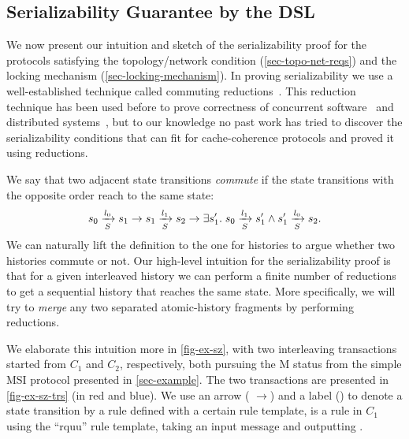 \documentclass[sigplan,10pt,review,anonymous,screen]{acmart}\settopmatter{printfolios=true,printccs=false,printacmref=false}
\begin{document}
\subsection{Serializability Guarantee by the \hemiola{} DSL}
\label{sec-sz-guarantee}

We now present our intuition and sketch of the serializability proof for the protocols satisfying the topology/network condition (\autoref{sec-topo-net-reqs}) and the locking mechanism (\autoref{sec-locking-mechanism}).
In proving serializability we use a well-established technique called commuting reductions~\cite{reduction}.
This reduction technique has been used before to prove correctness of concurrent software~\cite{Chajed:2018} and distributed systems~\cite{Hawblitzel:2015,Hawblitzel:2017}, but to our knowledge no past work has tried to discover the serializability conditions that can fit for cache-coherence protocols and proved it using reductions.

We say that two adjacent state transitions \emph{commute} if the state transitions with the opposite order reach to the same state:
\begin{displaymath}
  \semstep{S}{s_0}{l_0}{s_1} \to \semstep{S}{s_1}{l_1}{s_2} \to \exists s_1'.\; \semstep{S}{s_0}{l_1}{s_1'} \wedge \semstep{S}{s_1'}{l_0}{s_2}.
\end{displaymath}
We can naturally lift the definition to the one for histories to argue whether two histories commute or not.
Our high-level intuition for the serializability proof is that for a given interleaved history we can perform a finite number of reductions to get a sequential history that reaches the same state.
More specifically, we will try to \emph{merge} any two separated atomic-history fragments by performing reductions.

We elaborate this intuition more in \autoref{fig-ex-sz}, with two interleaving transactions started from $C_1$ and $C_2$, respectively, both pursuing the M status from the simple MSI protocol presented in \autoref{sec-example}.
The two transactions are presented in \autoref{fig-ex-sz-trs} (in {\color{myred} red} and {\color{myblue} blue}).
We use an arrow ({\color{myred} $\to$}) and a label () to denote a state transition by a rule defined with a certain rule template, \eg{}  is a rule in $C_1$ using the ``rquu'' rule template, taking an input message  and outputting .
\end{document}
